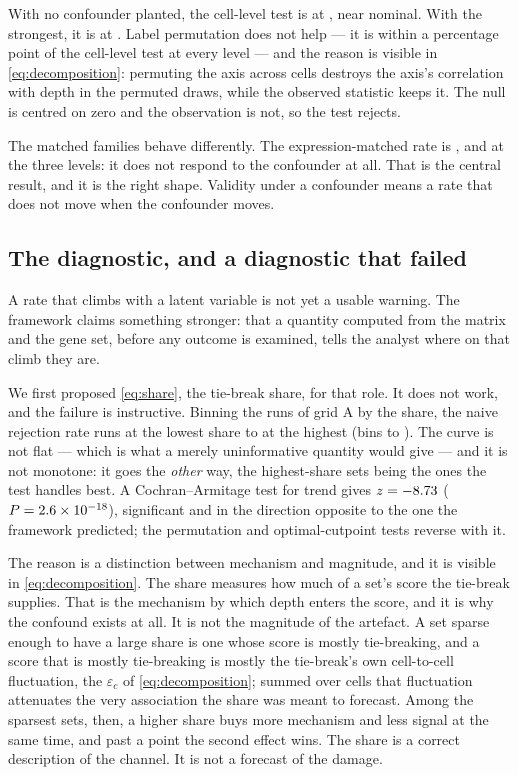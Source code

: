 \documentclass[11pt]{article}
\begin{document}
With no confounder planted, the cell-level test is at \confACellcor{}, near
nominal. With the strongest, it is at \confCCellcor. Label permutation does not
help --- it is within a percentage point of the cell-level test at every level
--- and the reason is visible in \eqref{eq:decomposition}: permuting the axis
across cells destroys the axis's correlation with depth in the permuted draws,
while the observed statistic keeps it. The null is centred on zero and the
observation is not, so the test rejects.

The matched families behave differently. The expression-matched rate is
\confAExpr, \confBExpr{} and \confCExpr{} at the three levels: it does not
respond to the confounder at all. That is the central result, and it is the
right shape. Validity under a confounder means a rate that does not move when
the confounder moves.

\subsection{The diagnostic, and a diagnostic that failed}
\label{sec:diagnostic}

A rate that climbs with a latent variable is not yet a usable warning. The
framework claims something stronger: that a quantity computed from the matrix
and the gene set, before any outcome is examined, tells the analyst where on
that climb they are.

We first proposed \eqref{eq:share}, the tie-break share, for that role. It does
not work, and the failure is instructive. Binning the \gridARuns{} runs of grid
A by the share, the naive rejection rate runs \shareLowestRate{} at the lowest
share to \shareHighestRate{} at the highest (bins \shareLowestBin{} to
\shareHighestBin{}). The curve is not flat --- which is what a merely
uninformative quantity would give --- and it is not monotone: it goes the
\emph{other} way, the highest-share sets being the ones the test handles best. A
Cochran--Armitage test for trend gives $z=-8.73$
($P=2.6\times10^{-18}$), significant and in the direction opposite to the one
the framework predicted; the permutation and optimal-cutpoint tests reverse with
it.

The reason is a distinction between mechanism and magnitude, and it is visible
in \eqref{eq:decomposition}. The share measures how much of a set's score the
tie-break supplies. That is the mechanism by which depth enters the score, and
it is why the confound exists at all. It is not the magnitude of the artefact.
A set sparse enough to have a large share is one whose score is mostly
tie-breaking, and a score that is mostly tie-breaking is mostly the tie-break's
own cell-to-cell fluctuation, the $\varepsilon_c$ of \eqref{eq:decomposition};
summed over cells that fluctuation attenuates the very association the share was
meant to forecast. Among the sparsest sets, then, a higher share buys more mechanism
and less signal at the same time, and past a point the second effect wins. The
share is a correct description of the channel. It is not a forecast of the
damage.
\end{document}
